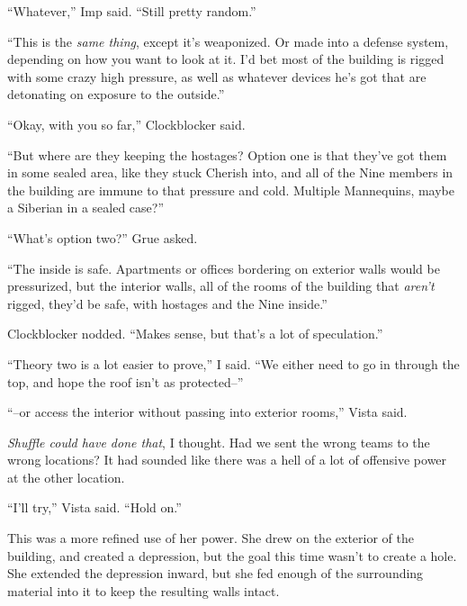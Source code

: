 ``Whatever,'' Imp said.  ``Still pretty random.''



``This is the \emph{same thing}, except it's weaponized.  Or made into a defense system, depending on how you want to look at it.  I'd bet most of the building is rigged with some crazy high pressure, as well as whatever devices he's got that are detonating on exposure to the outside.''



``Okay, with you so far,'' Clockblocker said.



``But where are they keeping the hostages?  Option one is that they've got them in some sealed area, like they stuck Cherish into, and all of the Nine members in the building are immune to that pressure and cold.  Multiple Mannequins, maybe a Siberian in a sealed case?''



``What's option two?'' Grue asked.



``The inside is safe.  Apartments or offices bordering on exterior walls would be pressurized, but the interior walls, all of the rooms of the building that \emph{aren't} rigged, they'd be safe, with hostages and the Nine inside.''



Clockblocker nodded.  ``Makes sense, but that's a lot of speculation.''



``Theory two is a lot easier to prove,'' I said.  ``We either need to go in through the top, and hope the roof isn't as protected--''



``--or access the interior without passing into exterior rooms,'' Vista said.



\emph{Shuffle could have done that}, I thought.  Had we sent the wrong teams to the wrong locations?  It had sounded like there was a hell of a lot of offensive power at the other location.



``I'll try,'' Vista said.  ``Hold on.''



This was a more refined use of her power.  She drew on the exterior of the building, and created a depression, but the goal this time wasn't to create a hole.  She extended the depression inward, but she fed enough of the surrounding material into it to keep the resulting walls intact.



